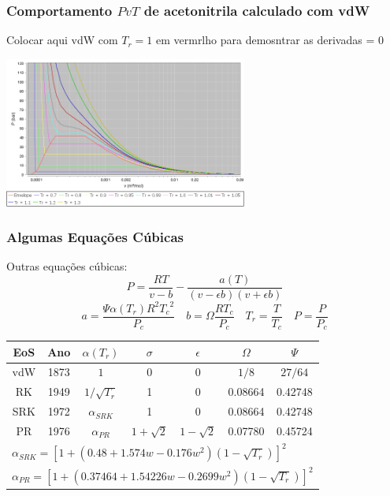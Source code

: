 \documentclass[aspectratio=169]{beamer}
\begin{document}
\begin{frame}
	\frametitle{Comportamento $PvT$ de acetonitrila calculado com vdW}
	Colocar aqui vdW com $T_r = 1$ em vermrlho para demosntrar as derivadas = 0
	\begin{center}
		\includegraphics[width=0.6\textwidth]{img/Acetonitrila.png} 
	\end{center}
\end{frame}

\begin{frame}
	\frametitle{Algumas Equações Cúbicas}
	Outras equações cúbicas:
	\begin{equation*}
		P= \frac{RT}{v-b}-\frac{a(T)}{(v-\epsilon b)(v+\epsilon b)}
	\end{equation*}
	\begin{equation*}
		a= \frac{\Psi \alpha(T_r) R^2 {T_c}^2}{P_c} \quad b= \Omega \frac{RT_c}{P_c}
		\quad T_r = \frac{T}{T_c} \quad P= \frac{P}{P_c}
	\end{equation*}
	\begin{table}
		\begin{tabular}{cc|ccccc}
		\hline
		{EoS} & Ano & {$\alpha(T_r)$} & {$\sigma$}& {$\epsilon$}&
		{$\Omega$}& {$\Psi$} \\
		\hline
		vdW  & 1873& $1$ & 0 & 0 & $1/8$ & $27/64$\\
		RK & 1949 & $1/\sqrt{T_r}$ & 1 & 0 & 0.08664& 0.42748\\
		SRK & 1972 & $\alpha_{SRK}$ & 1 & 0 & 0.08664& 0.42748\\
		PR & 1976 & $\alpha_{PR}$ & $1+\sqrt{2}$ & $1-\sqrt{2}$ & 0.07780 & 0.45724\\
		\hline
		\multicolumn{7}{l}{$\alpha_{SRK}=\left[1+\left(0.48+1.574w-0.176w^2\right)
		\left(1-\sqrt{T_r}\right) \right]^2$}\\
		\multicolumn{7}{l}{$\alpha_{PR}=\left[1+\left(0.37464+1.54226w-0.2699w^2\right)
		\left(1-\sqrt{T_r}\right) \right]^2$}\\
		\hline
		\end{tabular}
	\end{table}
\end{frame}
\end{document}
